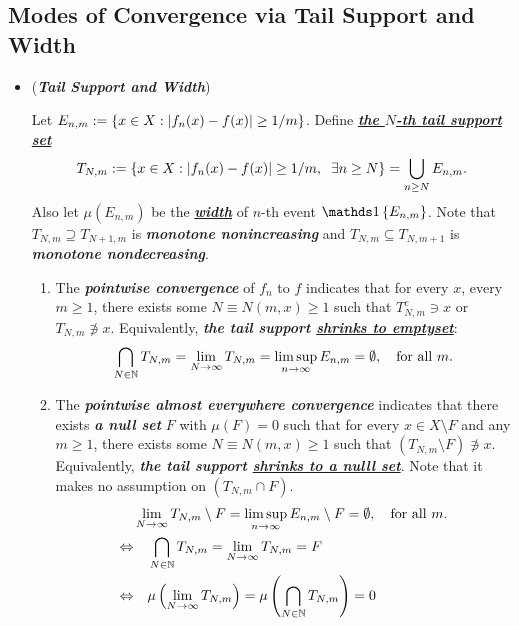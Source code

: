 \documentclass[11pt]{article}
\begin{document}
\subsection{Modes of Convergence via Tail Support and Width}
\begin{itemize}
\item \begin{remark} (\textit{\textbf{Tail Support and Width}})
\begin{definition}
Let $E_{n,m} := \left\{x \in X: \left\lvert f_n(x) - f(x) \right\rvert \ge 1/m\right\}$. Define \underline{\emph{\textbf{the $N$-th tail support set}}}
\begin{align*}
T_{N,m}:= \left\{x \in X: \left\lvert f_n(x) - f(x) \right\rvert \ge 1/m,\;\;\exists n\ge N\right\} = \bigcup_{n\ge N}E_{n,m}.
\end{align*} Also  let $\mu(E_{n,m})$ be the \underline{\emph{\textbf{width}}} of $n$-th event $\ind{E_{n, m}}$.  Note that $T_{N,m}\supseteq T_{N+1,m}$ is \emph{\textbf{monotone nonincreasing}} and  $T_{N,m}\subseteq T_{N,m+1}$ is \emph{\textbf{monotone nondecreasing}}.
\end{definition}
\begin{enumerate}
\item The \emph{\textbf{pointwise convergence}} of $f_{n}$ to $f$ indicates that for every $x$, every $m\ge 1$, there exists some $N \equiv N(m,x)\ge 1$ such that $ T_{N,m}^{c} \ni x$ or $T_{N, m} \not\ni x$.  Equivalently, \emph{\textbf{the tail support \underline{shrinks to emptyset}}}:
\begin{align*}
\bigcap_{N \in {\mathbb N}}T_{N,m} =  \lim\limits_{N\rightarrow \infty}T_{N,m} = \limsup\limits_{n\rightarrow \infty}E_{n,m} = \emptyset, \quad \text{for all }m.
\end{align*} 

\item The \emph{\textbf{pointwise almost everywhere convergence}} indicates that there exists \emph{\textbf{a null set}} $F$ with $\mu(F) = 0$ such that for every $x \in X \setminus F$ and any  $m\ge 1$, there exists some $N \equiv N(m,x)\ge 1$ such that  $(T_{N,m}\setminus F) \not\ni x$. Equivalently, \emph{\textbf{the tail support \underline{shrinks to a nulll set}}}. Note that it makes no assumption on $(T_{N,m}\cap F)$. 
\begin{align*}
&\lim\limits_{N\rightarrow \infty}T_{N,m} \setminus F = \limsup\limits_{n\rightarrow \infty}E_{n,m} \setminus F = \emptyset, \quad \text{for all }m.\\
\Leftrightarrow &\quad \bigcap_{N \in {\mathbb N}}T_{N,m} =   \lim\limits_{N\rightarrow \infty}T_{N,m} = F \\
\Leftrightarrow &\quad \mu\left( \lim\limits_{N\rightarrow \infty}T_{N,m}\right) = \mu\left( \bigcap_{N \in {\mathbb N}}T_{N,m}\right) = 0
\end{align*} 


\end{enumerate}
\end{remark}
\end{itemize}
\end{document}
